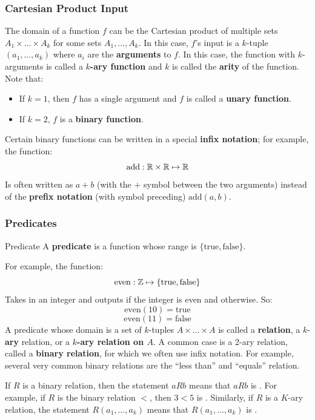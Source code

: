 \documentclass[letterpaper]{article}
\begin{document}
\subsubsection{Cartesian Product Input}
The domain of a function $f$ can be the Cartesian product of multiple sets $A_1 \times \dots \times A_k$ for some sets $A_1, \dots, A_k$. In this case, $f$'s input is a $k$-tuple $(a_1, \dots, a_k)$ where $a_i$ are the \textbf{arguments} to $f$. In this case, the function with $k$-arguments is called a \textbf{$k$-ary function} and $k$ is called the \textbf{arity} of the function. Note that:
\begin{itemize}
    \item If $k = 1$, then $f$ has a single argument and $f$ is called a \textbf{unary function}.
    \item If $k = 2$, $f$ is a \textbf{binary function}. 
\end{itemize}
Certain binary functions can be written in a special \textbf{infix notation}; for example, the function:
\[\text{add}: \mathbb{R} \times \mathbb{R} \mapsto \mathbb{R}\] 
Is often written as $a + b$ (with the $+$ symbol between the two arguments) instead of the \textbf{prefix notation} (with symbol preceding) $\text{add}(a, b)$. 

\subsubsection{Predicates}
\begin{definition}{Predicate}{}
    A \textbf{predicate} is a function whose range is $\{\text{true}, \text{false}\}$. 
\end{definition}
For example, the function:
\[\text{even}: \mathbb{Z} \mapsto \{\text{true}, \text{false}\}\] 
Takes in an integer and outputs  if the integer is even and  otherwise. So: 
\[\text{even}(10) = \text{true}\]
\[\text{even}(11) = \text{false}\]
A predicate whose domain is a set of $k$-tuples $A \times \dots \times A$ is called a \textbf{relation}, a $k$-\textbf{ary} relation, or a \textbf{$k$-ary relation on $A$}. A common case is a 2-ary relation, called a \textbf{binary relation}, for which we often use infix notation. For example, several very common binary relations are the ``less than'' and ``equals'' relation. 

\bigskip

If $R$ is a binary relation, then the statement $aRb$ means that $aRb$ is . For example, if $R$ is the binary relation $<$, then $3 < 5$ is . Similarly, if $R$ is a $K$-ary relation, the statement $R(a_1, \dots, a_k)$ means that $R(a_1, \dots, a_k)$ is .
\end{document}
